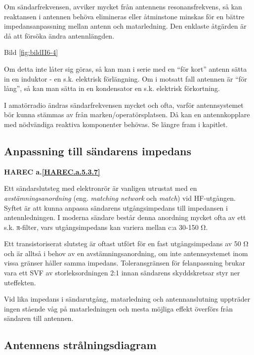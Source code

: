 Om sändarfrekvensen, avviker mycket från antennens resonansfrekvens,
så kan reaktansen i antennen behöva elimineras eller åtminstone
minskas för en bättre impedansanpassning mellan antenn och
matarledning. Den enklaste åtgärden är då att försöka ändra
antennlängden.

Bild \ref{fig:bildII6-4}

Om detta inte låter sig göras, så kan man i serie med en ``för kort''
antenn sätta in en induktor - en s.k. elektrisk förlängning. Om i
motsatt fall antennen är ``för lång'', så kan man sätta in en
kondensator en s.k. elektrisk förkortning.

I amatörradio ändras sändarfrekvensen mycket och ofta, varför
antennsystemet bör kunna stämmas av från marken/operatörsplatsen. Då
kan en antennkopplare med nödvändiga reaktiva komponenter behövas.  Se
längre fram i kapitlet.

\subsection{Anpassning till sändarens impedans}
\textbf{
HAREC a.\ref{HAREC.a.5.3.7}\label{myHAREC.a.5.3.7}
}

Ett sändarslutsteg med elektronrör är vanligen utrustat med en
\emph{avstämningsanordning} (eng. \emph{matching network} och \emph{match})
vid HF-utgången. Syftet är att kunna anpassa
sändarens utgångsimpedans till impedansen i antennledningen. I moderna
sändare består denna anordning mycket ofta av ett s.k. π-filter, vars
utgångsimpedans kan variera mellan c:a 30-150 Ω.

Ett transistoriserat slutsteg är oftast utfört för en fast
utgångsimpedans av 50 Ω och är alltså i behov av en
avstämningsanordning, om inte antennsystemet inom vissa gränser håller
samma impedans. Toleransgränsen för felanpassning brukar vara ett SVF
av storleksordningen 2:1 innan sändarens skyddskretsar styr ner
uteffekten.

Vid lika impedans i sändarutgång, matarledning och antennanslutning
uppträder ingen stående våg på matarledningen och mesta möjliga effekt
överförs från sändaren till antennen.

\subsection{Antennens strålningsdiagram}

